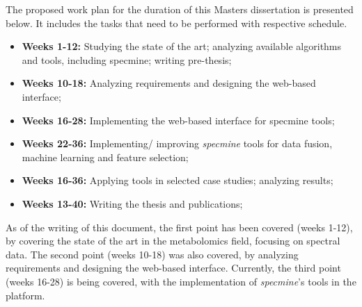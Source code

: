 The proposed work plan for the duration of this Masters dissertation is presented below. It includes the tasks that need to be performed with respective schedule.

\begin{itemize}
	
	\item \textbf{Weeks 1-12:} Studying the state of the art; analyzing available algorithms and tools, including specmine; writing pre-thesis;
	\item \textbf{Weeks 10-18:} Analyzing requirements and designing the web-based interface;
	\item \textbf{Weeks 16-28:} Implementing the web-based interface for specmine tools;
	\item \textbf{Weeks 22-36:} Implementing/ improving \textit{specmine} tools for data fusion, machine learning and feature selection;
	\item \textbf{Weeks 16-36:} Applying tools in selected case studies; analyzing results;
	\item \textbf{Weeks 13-40:} Writing the thesis and publications;
	
\end{itemize}

As of the writing of this document, the first point has been covered (weeks 1-12), by covering the state of the art in the metabolomics field, focusing on spectral data. The second point (weeks 10-18) was also covered, by analyzing requirements and designing the web-based interface. Currently, the third point (weeks 16-28) is being covered, with the implementation of \textit{specmine}'s tools in the platform.



%
%



